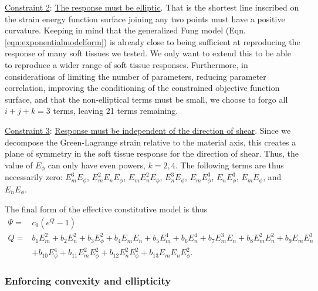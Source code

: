     \underline{Constraint 2}: \underline{The response must be elliptic}. That is the shortest line inscribed on the strain energy function surface joining any two points must have a positive curvature. Keeping in mind that the generalized Fung model (Eqn. \ref{eqn:exponentialmodelform}) is already close to being sufficient at reproducing the response of many soft tissues we tested. We only want to extend this to be able to reproduce a wider range of soft tissue responses. Furthermore, in considerations of limiting the number of parameters, reducing parameter correlation, improving the conditioning of the constrained objective function surface, and that the non-elliptical terms must be small, we choose to forgo all $i+j+k = 3$ terms, leaving 21 terms remaining. 
      
    \underline{Constraint 3}: \underline{Response must be independent of the direction of shear}. Since we decompose the Green-Lagrange strain relative to the material axis, this creates a plane of symmetry in the soft tissue response for the direction of shear. Thus, the value of $E_\phi$ can only have even powers, $k = 2,4$. The following terms are thus necessarily zero: $E_m^3E_\phi$, $E_m^2E_nE_\phi$, $E_mE_n^2E_\phi$, $E_n^3E_\phi$, $E_mE_\phi^3$, $E_nE_\phi^3$, $E_mE_\phi$, and $E_nE_\phi$. 
      
The final form of the effective constitutive model is thus
\begin{equation}
\begin{aligned}\label{eqn:generalizeexponentialform}
\Psi	=& c_0 \left(e^{Q} - 1\right) \\
Q		=& b_1 E_m^2 + b_2 E_n^2 + b_3 E_\phi^2 + b_4 E_m E_n + b_5 E_m^4 + b_6 E_n^4 + b_7 E_m^3 E_n + b_8 E_m^2 E_n^2 + b_9 E_m E_n^3	\\
	&+ b_{10} E_\phi^4 + b_{11} E_m^2E_\phi^2 + b_{12} E_n^2 E_\phi^2 + b_{13} E_m E_n E_\phi^2.
\end{aligned}
\end{equation}








\subsubsection{Enforcing convexity and ellipticity}

